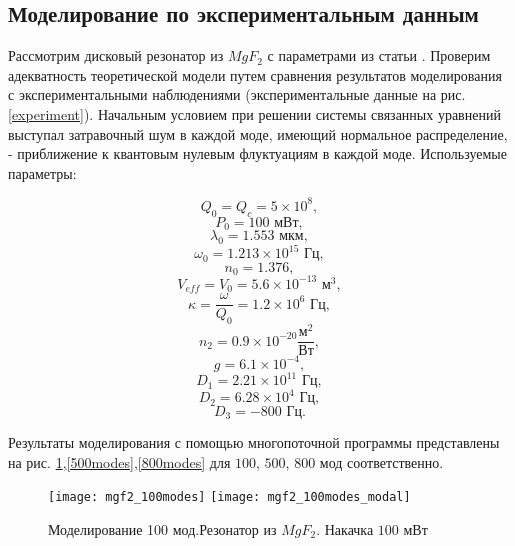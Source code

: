 \subsection{Моделирование по экспериментальным данным}
\label{subsection_experiment}

Рассмотрим дисковый резонатор из $MgF_2$ с параметрами из статьи \cite{Herr2014}. Проверим адекватность теоретической модели путем сравнения результатов моделирования с экспериментальными наблюдениями (экспериментальные данные на рис. \ref{experiment}). Начальным условием при решении системы связанных уравнений выступал затравочный шум в каждой моде, имеющий нормальное распределение, - приближение к квантовым нулевым флуктуациям в каждой моде. Используемые параметры:

\begin{equation}
Q_0=Q_c=5\times10^8,
\end{equation}
\begin{equation}
P_0=100\text{ мВт},
\end{equation}
\begin{equation}
\lambda_0=1.553\text{ мкм},
\end{equation}
\begin{equation}
\omega_0=1.213\times10^{15}\text{ Гц},
\end{equation}
\begin{equation}
n_0=1.376,
\end{equation}
\begin{equation}
V_{eff}=V_0=5.6\times10^{-13}\text{ м}^3,
\end{equation}
\begin{equation}
\kappa=\frac{\omega}{Q_0}=1.2\times10^6\text{ Гц},
\end{equation}
\begin{equation}
n_2=0.9\times10^{-20}\frac{\text{м}^2}{\text{Вт}},
\end{equation}
\begin{equation}
g=6.1\times10^{-4},
\end{equation}
\begin{equation}
D_1=2.21\times10^{11}\text{ Гц},
\end{equation}
\begin{equation}
D_2=6.28\times10^4\text{ Гц},
\end{equation}
\begin{equation}
D_3=-800\text{ Гц}.
\end{equation}

Результаты моделирования с помощью многопоточной программы представлены на рис. \ref{100modes},\ref{500modes},\ref{800modes} для $100$, $500$, $800$ мод соответственно.
\begin{figure}
  \texttt{[image: mgf2\_100modes]}
  \texttt{[image: mgf2\_100modes\_modal]}
  \caption{Моделирование 100 мод.Резонатор из $MgF_2$. Накачка $100$ мВт} \label{100modes}
\end{figure}


